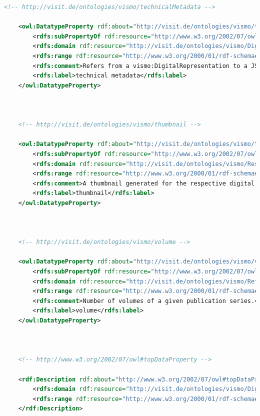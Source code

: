 \begin{lstlisting}[caption={VisMo Ontologie in der letzten (englischen) Version.},label={lst:vismo},captionpos=b,language=xml]
    <!-- http://visit.de/ontologies/vismo/technicalMetadata -->

    <owl:DatatypeProperty rdf:about="http://visit.de/ontologies/vismo/technicalMetadata">
        <rdfs:subPropertyOf rdf:resource="http://www.w3.org/2002/07/owl#topDataProperty"/>
        <rdfs:domain rdf:resource="http://visit.de/ontologies/vismo/DigitalRepresentation"/>
        <rdfs:range rdf:resource="http://www.w3.org/2000/01/rdf-schema#Literal"/>
        <rdfs:comment>Refers from a vismo:DigitalRepresentation to a JSON formatted String that represents the technical metadata that is produced by the process that creates given digital representation.</rdfs:comment>
        <rdfs:label>technical metadata</rdfs:label>
    </owl:DatatypeProperty>
    


    <!-- http://visit.de/ontologies/vismo/thumbnail -->

    <owl:DatatypeProperty rdf:about="http://visit.de/ontologies/vismo/thumbnail">
        <rdfs:subPropertyOf rdf:resource="http://www.w3.org/2002/07/owl#topDataProperty"/>
        <rdfs:domain rdf:resource="http://visit.de/ontologies/vismo/Resource"/>
        <rdfs:range rdf:resource="http://www.w3.org/2000/01/rdf-schema#Literal"/>
        <rdfs:comment>A thumbnail generated for the respective digital representation. In general a base 64 encoding.</rdfs:comment>
        <rdfs:label>thumbnail</rdfs:label>
    </owl:DatatypeProperty>
    


    <!-- http://visit.de/ontologies/vismo/volume -->

    <owl:DatatypeProperty rdf:about="http://visit.de/ontologies/vismo/volume">
        <rdfs:subPropertyOf rdf:resource="http://www.w3.org/2002/07/owl#topDataProperty"/>
        <rdfs:domain rdf:resource="http://visit.de/ontologies/vismo/Reference"/>
        <rdfs:range rdf:resource="http://www.w3.org/2000/01/rdf-schema#Literal"/>
        <rdfs:comment>Number of volumes of a given publication series.</rdfs:comment>
        <rdfs:label>volume</rdfs:label>
    </owl:DatatypeProperty>
    


    <!-- http://www.w3.org/2002/07/owl#topDataProperty -->

    <rdf:Description rdf:about="http://www.w3.org/2002/07/owl#topDataProperty">
        <rdfs:domain rdf:resource="http://visit.de/ontologies/vismo/DigitalRepresentation"/>
        <rdfs:range rdf:resource="http://www.w3.org/2000/01/rdf-schema#Literal"/>
    </rdf:Description>
    



\end{lstlisting}
